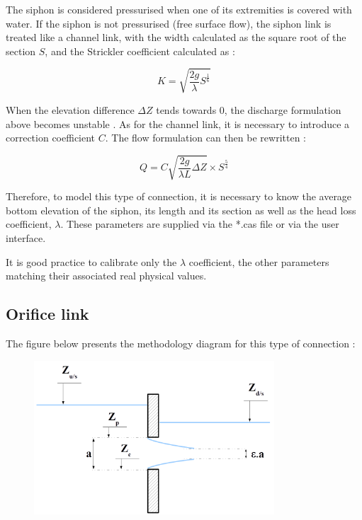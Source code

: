 The siphon is considered pressurised when one of its extremities is covered with water. If the siphon is not pressurised (free surface flow), the siphon link is treated like a channel link, with the width calculated as the square root of the section $S$, and the Strickler coefficient calculated as :

\begin{equation}
 K = \sqrt{\frac{2 g}{\lambda} S^{\frac{1}{6}}}
\end{equation}

When the elevation difference $\Delta Z$ tends towards $0$, the discharge formulation above becomes unstable \cite{RISSOAN02}. As for the channel link, it is necessary to introduce a correction coefficient $C$. The flow formulation can then be rewritten :

\begin{equation}
 Q = C \sqrt{\frac{2 g}{\lambda L}\Delta Z} \times S^{\frac{5}{4}}
\end{equation}

Therefore, to model this type of connection, it is necessary to know the average bottom elevation of the siphon, its length and its section as well as the head loss coefficient, $\lambda$. These parameters are supplied via the *.cas file or via the user interface.

It is good practice to calibrate only the $\lambda$ coefficient, the other parameters matching their associated real physical values.

\subsection{Orifice link}

The figure below presents the methodology diagram for this type of connection :

\begin{figure}[H]
 \begin{center}
  \includegraphics[width=0.8\textwidth]{Figures/Lorifice.png}
 \end{center}
\end{figure}

